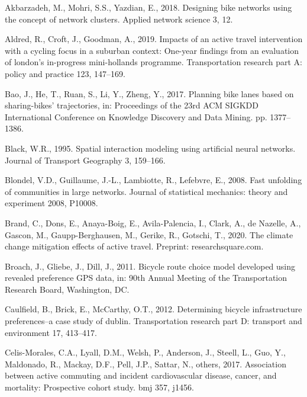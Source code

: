 \documentclass[
]{article}
\newlength{\cslhangindent}
\newlength{\cslentryspacingunit} %
\newenvironment{CSLReferences}[2] %
 {%
  \setlength{\parindent}{0pt}
  \ifodd #1
  \let\oldpar\par
  \def\par{\hangindent=\cslhangindent\oldpar}
  \fi
  \setlength{\parskip}{#2\cslentryspacingunit}
 }%
 {}
\begin{document}
\hypertarget{refs}{}
\begin{CSLReferences}{1}{0}
\leavevmode{}%
Akbarzadeh, M., Mohri, S.S., Yazdian, E., 2018. Designing bike networks using the concept of network clusters. Applied network science 3, 12.

\leavevmode{}%
Aldred, R., Croft, J., Goodman, A., 2019. Impacts of an active travel intervention with a cycling focus in a suburban context: One-year findings from an evaluation of london's in-progress mini-hollands programme. Transportation research part A: policy and practice 123, 147--169.

\leavevmode{}%
Bao, J., He, T., Ruan, S., Li, Y., Zheng, Y., 2017. Planning bike lanes based on sharing-bikes' trajectories, in: Proceedings of the 23rd ACM SIGKDD International Conference on Knowledge Discovery and Data Mining. pp. 1377--1386.

\leavevmode{}%
Black, W.R., 1995. Spatial interaction modeling using artificial neural networks. Journal of Transport Geography 3, 159--166.

\leavevmode{}%
Blondel, V.D., Guillaume, J.-L., Lambiotte, R., Lefebvre, E., 2008. Fast unfolding of communities in large networks. Journal of statistical mechanics: theory and experiment 2008, P10008.

\leavevmode{}%
Brand, C., Dons, E., Anaya-Boig, E., Avila-Palencia, I., Clark, A., de Nazelle, A., Gascon, M., Gaupp-Berghausen, M., Gerike, R., Gotschi, T., 2020. The climate change mitigation effects of active travel. Preprint: researchsquare.com.

\leavevmode{}%
Broach, J., Gliebe, J., Dill, J., 2011. Bicycle route choice model developed using revealed preference GPS data, in: 90th Annual Meeting of the Transportation Research Board, Washington, DC.

\leavevmode{}%
Caulfield, B., Brick, E., McCarthy, O.T., 2012. Determining bicycle infrastructure preferences--a case study of dublin. Transportation research part D: transport and environment 17, 413--417.

\leavevmode{}%
Celis-Morales, C.A., Lyall, D.M., Welsh, P., Anderson, J., Steell, L., Guo, Y., Maldonado, R., Mackay, D.F., Pell, J.P., Sattar, N., others, 2017. Association between active commuting and incident cardiovascular disease, cancer, and mortality: Prospective cohort study. bmj 357, j1456.


\end{CSLReferences}
\end{document}
